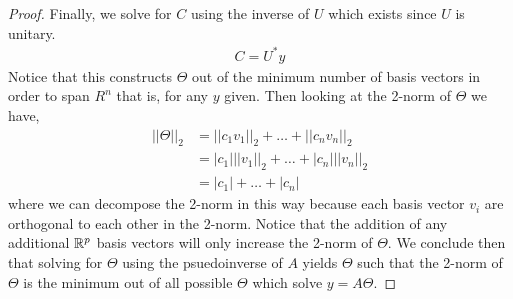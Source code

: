 \documentclass{article}
\begin{document}
\begin{proof}
    Finally, we solve for $C$ using the inverse of $U$ which exists since $U$ is
    unitary. 
    \begin{gather*}
        C = U^*y
    \end{gather*}
    Notice that this constructs $\Theta$ out of the minimum number of basis
    vectors in order to span $R^{n}$ that is, for any $y$ given. Then looking at
    the 2-norm of $\Theta$ we have, 
    \begin{align*}
        ||\Theta||_2 &= ||c_1v_1||_2 + \ldots + ||c_nv_n||_2\\
         &= |c_1|||v_1||_2 + \ldots + |c_n|||v_n||_2\\
         &= |c_1| + \ldots + |c_n|
    \end{align*}
    where we can decompose the 2-norm in this way because each basis vector
    $v_i$ are orthogonal to each other in the 2-norm. Notice that the addition
    of any additional $\mathbb{R}^{p}$ basis vectors will only increase the 2-norm of
    $\Theta$. We conclude then that solving for $\Theta$ using the psuedoinverse
    of $A$ yields $\Theta$ such that the 2-norm of $\Theta$ is the minimum out
    of all possible $\Theta$ which solve $y=A\Theta$. 
\end{proof}
\end{document}
